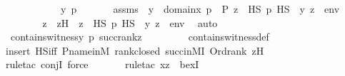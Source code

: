 \begin{isabellebody}
\ \ \isamarkupfalse%
\ {\isacharminus}{\kern0pt}\ \isanewline
\ \ \ \ \isamarkupfalse%
\ y\ p\ \isanewline
\ \ \ \ \isamarkupfalse%
\ assms{}\ {\isacharcolon}{\kern0pt}\ {\isachardoublequoteopen}y\ {\isasymin}\ domain{\isacharparenleft}{\kern0pt}x{\isacharparenright}{\kern0pt}{\isachardoublequoteclose}\ {\isachardoublequoteopen}p\ {\isasymin}\ P{\isachardoublequoteclose}\ {\isachardoublequoteopen}{\isasymexists}z\ {\isasymin}\ HS{\isachardot}{\kern0pt}\ p\ {\isasymtturnstile}HS\ {\isasymphi}\ {\isacharparenleft}{\kern0pt}{\isacharbrackleft}{\kern0pt}y{\isacharcomma}{\kern0pt}\ z{\isacharbrackright}{\kern0pt}\ {\isacharat}{\kern0pt}\ env{\isacharparenright}{\kern0pt}{\isachardoublequoteclose}\ \isanewline
\isanewline
\ \ \ \ \isamarkupfalse%
\ \isamarkupfalse%
\ z\ \ zH\ {\isacharcolon}{\kern0pt}\ {\isachardoublequoteopen}z\ {\isasymin}\ HS{\isachardoublequoteclose}\ {\isachardoublequoteopen}p\ {\isasymtturnstile}HS\ {\isasymphi}\ {\isacharparenleft}{\kern0pt}{\isacharbrackleft}{\kern0pt}y{\isacharcomma}{\kern0pt}\ z{\isacharbrackright}{\kern0pt}\ {\isacharat}{\kern0pt}\ env{\isacharparenright}{\kern0pt}{\isachardoublequoteclose}\ \isamarkupfalse%
\ auto\isanewline
\ \ \ \ \isamarkupfalse%
\ {\isachardoublequoteopen}contains{\isacharunderscore}{\kern0pt}witness{\isacharparenleft}{\kern0pt}y{\isacharcomma}{\kern0pt}\ p{\isacharcomma}{\kern0pt}\ succ{\isacharparenleft}{\kern0pt}rank{\isacharparenleft}{\kern0pt}z{\isacharparenright}{\kern0pt}{\isacharparenright}{\kern0pt}{\isacharparenright}{\kern0pt}{\isachardoublequoteclose}\ \isanewline
\ \ \ \ \ \ \isamarkupfalse%
\ contains{\isacharunderscore}{\kern0pt}witness{\isacharunderscore}{\kern0pt}def\ \isanewline
\ \ \ \ \ \ \isamarkupfalse%
{\isacharparenleft}{\kern0pt}insert\ HS{\isacharunderscore}{\kern0pt}iff\ P{\isacharunderscore}{\kern0pt}name{\isacharunderscore}{\kern0pt}in{\isacharunderscore}{\kern0pt}M\ rank{\isacharunderscore}{\kern0pt}closed\ succ{\isacharunderscore}{\kern0pt}in{\isacharunderscore}{\kern0pt}MI\ Ord{\isacharunderscore}{\kern0pt}rank\ zH{\isacharparenright}{\kern0pt}\isanewline
\ \ \ \ \ \ \isamarkupfalse%
{\isacharparenleft}{\kern0pt}rule{\isacharunderscore}{\kern0pt}tac\ conjI{\isacharcomma}{\kern0pt}\ force{\isacharparenright}{\kern0pt}{\isacharplus}{\kern0pt}\isanewline
\ \ \ \ \ \ \isamarkupfalse%
{\isacharparenleft}{\kern0pt}rule{\isacharunderscore}{\kern0pt}tac\ x{\isacharequal}{\kern0pt}z\ \ bexI{\isacharparenright}{\kern0pt}\isanewline

\end{isabellebody}
